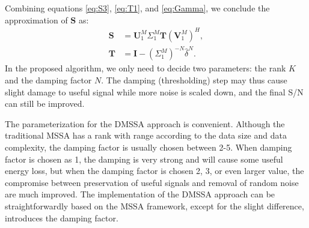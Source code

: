 Combining equations \ref{eq:S3}, \ref{eq:T1}, and \ref{eq:Gamma}, we conclude the approximation of $\mathbf{S}$ as:
\begin{align}
\label{eq:S4}
\mathbf{S} & = \mathbf{U}_1^M \Sigma_1^M\mathbf{T}(\mathbf{V}_1^M)^H,\\
\label{eq:T2}
\mathbf{T} & =\mathbf{I}-(\Sigma_1^M)^{-N}\hat{\delta}^N.
\end{align} 
 In the proposed algorithm, we only need to decide  two parameters: the rank $K$ and the damping factor $N$.   The damping (thresholding) step may thus cause slight damage to useful signal while more noise is scaled down, and the final S/N can still be  improved.

The parameterization for the DMSSA approach is  convenient. Although the traditional MSSA has a rank with  range according to the data size and data complexity, the damping factor is usually chosen between 2-5. When damping factor is chosen as 1, the damping is very strong and will cause some useful energy loss, but when the damping factor is chosen  2, 3, or even larger value, the compromise between preservation of useful signals and removal of random noise are much improved. The implementation of the DMSSA approach can be straightforwardly based on the MSSA framework, except for the slight difference,  introduces the damping factor. 

